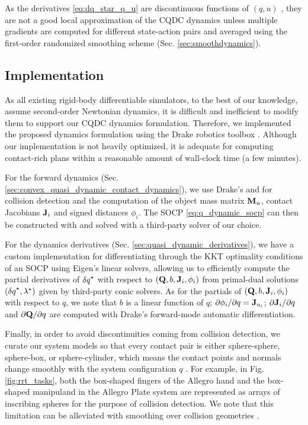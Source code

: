 As the derivatives \eqref{eq:dq_star_q_u} are discontinuous functions of $(q, u)$ \cite{bundledgradients}, they are not a good local approximation of the CQDC dynamics unless multiple gradients are computed for different state-action pairs and averaged using the first-order randomized smoothing scheme (Sec. \ref{sec:smoothdynamics}).

\subsection{Implementation} \label{sec:quasi_static:implementation}
As all existing rigid-body differentiable simulators, to the best of our knowledge, assume second-order Newtonian dynamics, it is difficult and inefficient to modify them to support our CQDC dynamics formulation. Therefore, we implemented the proposed dynamics formulation using the Drake robotics toolbox \cite{drake}. Although our implementation is not heavily optimized, it is adequate for computing contact-rich plans within a reasonable amount of wall-clock time (a few minutes). 

For the forward dynamics (Sec. \ref{sec:convex_quasi_dynamic_contact_dynamics}), we use Drake's  and  for collision detection and the computation of the object mass matrix $\Mu$, contact Jacobians $\J_i$ and signed distances $\phi_i$. The SOCP \eqref{eq:q_dynamic_socp} can then be constructed with  and solved with a third-party solver of our choice.

For the dynamics derivatives (Sec. \ref{sec:quasi_dynamic_derivatives}), we have a custom implementation for differentiating through the KKT optimality conditions of an SOCP using Eigen's \cite{eigenweb} linear solvers, allowing us to efficiently compute the partial derivatives of $\dq^\star$ with respect to $(\mathbf{Q}, b, \J_i, \phi_i)$ from primal-dual solutions $(\dq^\star, \lambda^\star)$ given by third-party conic solvers. As for the partials of $(\mathbf{Q}, b, \J_i, \phi_i)$ with respect to $q$, we note that $b$ is a linear function of $q$;  $\DfDxLine{\phi_i}{q} = \Jn[i]$; $\DfDxLine{\J_i}{q}$ and $\DfDxLine{\mathbf{Q}}{q}$ are computed with Drake's forward-mode automatic differentiation.

Finally, in order to avoid discontinuities coming from collision detection, we curate our system models so that every contact pair is either sphere-sphere, sphere-box, or sphere-cylinder, which means the contact points and normals change smoothly with the system configuration $q$ \cite{SiggraphContact22}. For example, in Fig. \ref{fig:rrt_tasks}, both the box-shaped fingers of the Allegro hand and the box-shaped manipuland in the Allegro Plate system are represented as arrays of inscribing spheres for the purpose of collision detection.
We note that this limitation can be alleviated with smoothing over collision geometries \cite{simonsinglelevel,randomizedsmoothingcollision}. 

